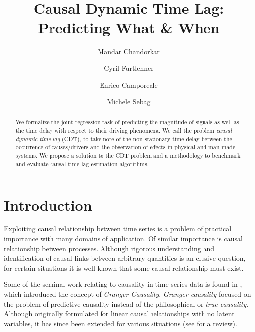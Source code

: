 \documentclass[runningheads]{llncs}
\begin{document}
%
\title{Causal Dynamic Time Lag: Predicting What \& When}
%
%
\author{Mandar Chandorkar \and
Cyril Furtlehner \and
Enrico Camporeale \and 
Michele Sebag
}
%
%
%
\maketitle              %
%
\begin{abstract}
  We formalize the joint regression task of predicting the magnitude of signals as well as the 
  time delay with respect to their driving phenomena. We call the problem 
  \emph{causal dynamic time lag} (CDT), to take note of the non-stationary time delay between the 
  occurrence of causes/drivers and the observation of effects in physical and man-made systems. 
  We propose a solution to the CDT problem and a methodology to benchmark and evaluate 
  causal time lag estimation algorithms.
\end{abstract}

\section{Introduction}
Exploiting causal relationship between time series is a problem of practical importance 
with many domains of application. Of similar importance is causal relationship between processes. 
Although rigorous understanding and identification of causal links between arbitrary quantities 
is an elusive question, for certain situations it is well known that some causal relationship 
must exist. 

Some of the seminal work relating to causality in time series data is found in \cite{Granger}, 
which introduced the concept of \emph{Granger Causality}. \emph{Granger causality} focused on the 
problem of predictive causality instead of the philosophical or \emph{true causality}. Although 
originally formulated for linear causal relationships with no latent variables, it has since been 
extended for various situations (see \cite{doi:10.1002/9781119945710.ch22} for a review).
\end{document}
